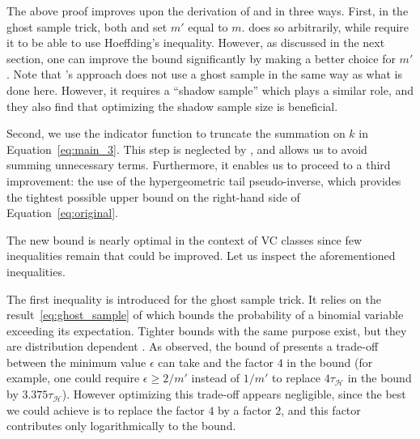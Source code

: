 \documentclass[twoside,11pt]{article}
\renewcommand{\H}{{\mathcal{H}}}
\begin{document}
The above proof improves upon the derivation of \cite{vapnik98} and \cite{as-93} in three ways.
First, in the ghost sample trick, both \cite{vapnik98} and \cite{as-93} set $m'$ equal to $m$.
\citeauthor{vapnik98} does so arbitrarily, while \citeauthor{as-93} require it to be able to use Hoeffding's inequality.
However, as discussed in the next section, one can improve the bound significantly by making a better choice for $m'$.
Note that \citet{catoni2004improved}'s approach does not use a ghost sample in the same way as what is done here.
However, it requires a ``shadow sample'' which plays a similar role, and they also find that optimizing the shadow sample size is beneficial.

Second, we use the indicator function to truncate the summation on $k$ in Equation~\eqref{eq:main_3}.
This step is neglected by \cite{vapnik98}, and allows us to avoid summing unnecessary terms.
Furthermore, it enables us to proceed to a third improvement: the use of the hypergeometric tail pseudo-inverse, which 
provides the tightest possible upper bound on the right-hand side of Equation~\eqref{eq:original}.

The new bound is nearly optimal in the context of VC classes since few inequalities remain that could be improved.
Let us inspect the aforementioned inequalities.

The first inequality is introduced for the ghost sample trick.
It relies on the result~\eqref{eq:ghost_sample} of \cite{greenberg14} which bounds the probability of a binomial variable exceeding its expectation.
Tighter bounds with the same purpose exist, but they are distribution dependent \citep{pelekis2016lower,doerr2018elementary}.
As \cite{cortes2019relative} observed, the bound of \cite{greenberg14} presents a trade-off between the minimum value $\epsilon$ can take and the factor $4$ in the bound (for example, one could require $\epsilon \ge 2/m'$ instead of $1/m'$ to replace $4\tau_\H$ in the bound by $3.375\tau_\H$).
However optimizing this trade-off appears negligible, since the best we could achieve is to replace the factor $4$ by a factor $2$, and this factor contributes only logarithmically to the bound.
\end{document}
